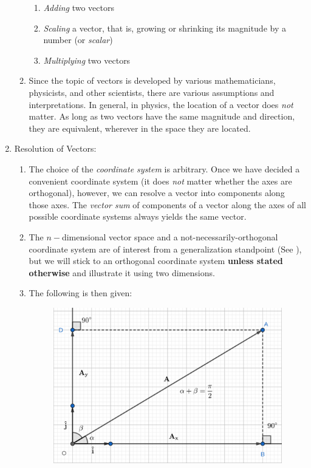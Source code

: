 \documentclass[12pt,a4paper]{book}
\newcounter{solution}[chapter] %
\begin{document}
\begin{enumerate}
\begin{enumerate}
\begin{enumerate}
                    \item \emph{Adding} two vectors
                    \item \emph{Scaling} a vector, that is, growing or shrinking its magnitude by a number (or \emph{scalar})
                    \item \emph{Multiplying} two vectors
                \end{enumerate}
            \item Since the topic of vectors is developed by various mathematicians, physicists, and other scientists, there are various assumptions and interpretations. In general, in physics, the location of a vector does \emph{not} matter. As long as two vectors have the same magnitude and direction, they are equivalent, wherever in the space they are located.
        \end{enumerate}
    \item Resolution of Vectors:
        \begin{enumerate}
            \item The choice of the \emph{coordinate system} is arbitrary. Once we have decided a convenient coordinate system (it does \emph{not} matter whether the axes are orthogonal), however, we can resolve a vector into components along those axes. The \emph{vector sum} of components of a vector along the axes of all possible coordinate systems always yields the same vector.
            \item The $n-$dimensional vector space and a not-necessarily-orthogonal coordinate system are of interest from a generalization standpoint (See \cite{resolution-q-phy-fo}), but we will stick to an orthogonal coordinate system \textbf{unless stated otherwise} and illustrate it using two dimensions.
            \item The following is then given:
                \begin{figure}[h!]
                    \centering
                    \includegraphics[width=0.7\linewidth]{basic-2d-orthogonal-axes.png}

\end{figure}
\end{enumerate}
\end{enumerate}
\end{document}
